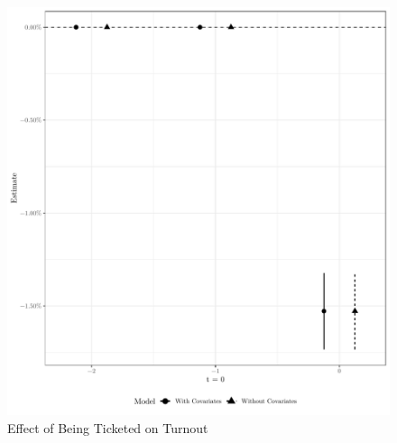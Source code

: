 \documentclass[
  12pt,
]{article}
\begin{document}
\begin{figure}[H]

{\centering \includegraphics{compile_files/figure-latex/event-study-primary-1} 

}

\caption{\label{fig:did-1}Effect of Being Ticketed on Turnout}\label{fig:event-study-primary}
\end{figure}
\end{document}
